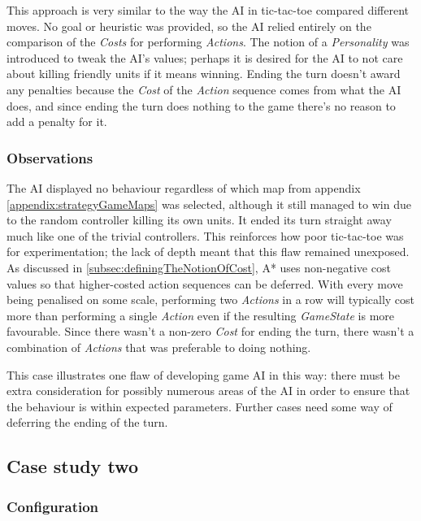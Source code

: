 \documentclass[11pt, a4paper]{report}
\begin{document}
This approach is very similar to the way the AI in tic-tac-toe compared different moves. No goal or heuristic was provided, so the AI relied entirely on the comparison of the \emph{Costs} for performing \emph{Actions}. The notion of a \emph{Personality} was introduced to tweak the AI's values; perhaps it is desired for the AI to not care about killing friendly units if it means winning. Ending the turn doesn't award any penalties because the \emph{Cost} of the \emph{Action} sequence comes from what the AI does, and since ending the turn does nothing to the game there's no reason to add a penalty for it.

\subsubsection{Observations}

The AI displayed no behaviour regardless of which map from appendix \ref{appendix:strategyGameMaps} was selected, although it still managed to win due to the random controller killing its own units. It ended its turn straight away much like one of the trivial controllers. This reinforces how poor tic-tac-toe was for experimentation; the lack of depth meant that this flaw remained unexposed. As discussed in \ref{subsec:definingTheNotionOfCost}, A* uses non-negative cost values so that higher-costed action sequences can be deferred. With every move being penalised on some scale, performing two \emph{Actions} in a row will typically cost more than performing a single \emph{Action} even if the resulting \emph{GameState} is more favourable. Since there wasn't a non-zero \emph{Cost} for ending the turn, there wasn't a combination of \emph{Actions} that was preferable to doing nothing. 

This case illustrates one flaw of developing game AI in this way: there must be extra consideration for possibly numerous areas of the AI in order to ensure that the behaviour is within expected parameters. Further cases need some way of deferring the ending of the turn.

\subsection{Case study two}
\label{subsec:caseStudyTwo}

\subsubsection{Configuration}
\end{document}
